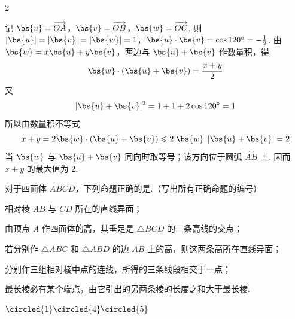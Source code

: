 \begin{answer}
2
\end{answer}

\begin{solution}
记 \(\bs{u}=\overrightarrow{OA}\)，\(\bs{v}=\overrightarrow{OB}\)，\(\bs{w}=\overrightarrow{OC}\). 则
\(|\bs{u}|=|\bs{v}|=|\bs{w}|=1\)，\(\bs{u}\cdot\bs{v}=\cos120^{\circ}=-\frac{1}{2}\).
由 \(\bs{w}=x\bs{u}+y\bs{v}\)，两边与 \(\bs{u}+\bs{v}\) 作数量积，得
\[
\bs{w}\cdot(\bs{u}+\bs{v})=\frac{x+y}{2}
\]
又
\[
|\bs{u}+\bs{v}|^2=1+1+2\cos120^{\circ}=1
\]
所以由数量积不等式
\[
x+y=2\bs{w}\cdot(\bs{u}+\bs{v})\leqslant2|\bs{w}|\,|\bs{u}+\bs{v}|=2
\]
当 \(\bs{w}\) 与 \(\bs{u}+\bs{v}\) 同向时取等号；该方向位于圆弧 \(\overset{\frown}{AB}\) 上. 因而 \(x+y\) 的最大值为 \(2\).
\end{solution}

\begin{problem}
对于四面体 \(ABCD\)，下列命题正确的是\fillinblank{}.（写出所有正确命题的编号）

\begin{circlelist}
\item 相对棱 \(AB\) 与 \(CD\) 所在的直线异面；
\item 由顶点 \(A\) 作四面体的高，其垂足是 \(\triangle BCD\) 的三条高线的交点；
\item 若分别作 \(\triangle ABC\) 和 \(\triangle ABD\) 的边 \(AB\) 上的高，则这两条高所在直线异面；
\item 分别作三组相对棱中点的连线，所得的三条线段相交于一点；
\item 最长棱必有某个端点，由它引出的另两条棱的长度之和大于最长棱.
\end{circlelist}
\end{problem}

\begin{answer}
\(\circled{1}\circled{4}\circled{5}\)
\end{answer}

